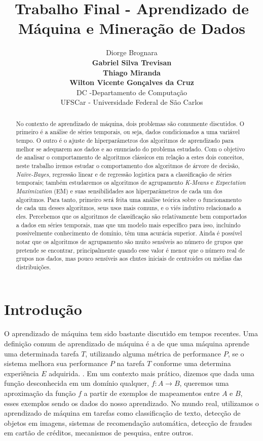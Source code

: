 \documentclass{article}
\title{Trabalho Final - Aprendizado de Máquina e Mineração de Dados}
\author{
Diorge Brognara \\
{\bf Gabriel Silva Trevisan}  \\
{\bf Thiago Miranda} \\
{\bf Wilton Vicente Gonçalves da Cruz} \\
DC -Departamento de Computação \\
UFSCar - Universidade Federal de São Carlos \\
}
\begin{document}
\maketitle

\begin{abstract}
No contexto de aprendizado de máquina, dois problemas são comumente discutidos.
O primeiro é a análise de séries temporais, ou seja, dados condicionados a uma variável tempo.
O outro é o ajuste de hiperparâmetros dos algoritmos de aprendizado para melhor se adequarem aos dados e ao enunciado do problema estudado.
Com o objetivo de analisar o comportamento de algoritmos clássicos em relação a estes dois conceitos,
neste trabalho iremos estudar o comportamento dos algoritmos de árvore de decisão, {\it Naïve-Bayes},
regressão linear e de regressão logística para a classificação de séries temporais;
também estudaremos os algoritmos de agrupamento {\it K-Means} e {\it Expectation Maximization} (EM)
e suas sensibilidades aos hiperparâmetros de cada um dos algoritmos.
Para tanto, primeiro será feita uma análise teórica sobre o funcionamento de cada um desses algoritmos,
seus usos mais comuns, e o viés indutivo relacionado a eles.
Percebemos que os algoritmos de classificação são relativamente bem comportados a dados em séries temporais,
mas que um modelo mais específico para isso, incluindo possivelmente conhecimento de domínio, têm uma acurácia superior.
Ainda é possível notar que os algoritmos de agrupamento são muito sensíveis ao número de grupos que pretende se encontrar,
principalmente quando esse valor é menor que o número real de grupos nos dados,
mas pouco sensíveis aos chutes iniciais de centroides ou médias das distribuições.
\end{abstract}

\section{Introdução}

O aprendizado de máquina tem sido bastante discutido em tempos recentes.
Uma definição comum de aprendizado de máquina é a de que uma máquina aprende uma determinada tarefa $T$,
utilizando alguma métrica de performance $P$, se o sistema melhora sua performance $P$ na tarefa $T$ conforme
uma determina experiência $E$ adquirida. \cite{mitchell06}.
Em um contexto mais prático, dizemos que dada uma função desconhecida em um domínio qualquer, $f : A \to B$,
queremos uma aproximação da função $f$ a partir de exemplos de mapeamentos entre $A$ e $B$,
esses exemplos sendo os dados do nosso aprendizado.
No mundo real, utilizamos o aprendizado de máquina em tarefas como classificação de texto,
detecção de objetos em imagens, sistemas de recomendação automática,
detecção de fraudes em cartão de créditos, mecanismos de pesquisa, entre outros.
\end{document}
